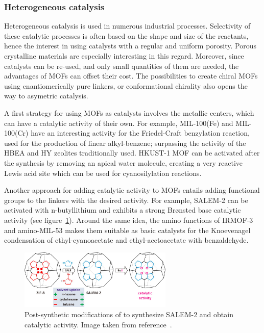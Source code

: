\documentclass[thesis]{subfiles}
\begin{document}
\subsubsection{Heterogeneous catalysis}

Heterogeneous catalysis is used in numerous industrial processes. Selectivity of
these catalytic processes is often based on the shape and size of the reactants,
hence the interest in using catalysts with a regular and uniform porosity.
Porous crystalline materials are especially interesting in this regard.
Moreover, since catalysts can be re-used, and only small quantities of them are
needed, the advantages of MOFs can offset their cost. The possibilities to
create chiral MOFs using enantiomerically pure linkers, or conformational
chirality\cite{Tshabang2018} also opens the way to asymetric catalysis.

A first strategy for using MOFs as catalysts involves the metallic centers,
which can have a catalytic activity of their own. For example, MIL-100(Fe) and
MIL-100(Cr) have an interesting activity for the Friedel-Craft benzylation
reaction, used for the production of linear alkyl-benzene; surpassing the
activity of the HBEA and HY zeolites traditionally used\cite{Horcajada2007}.
HKUST-1 MOF can be activated after the synthesis by removing an apical water
molecule, creating a very reactive Lewis acid site which can be used for
cyanosilylation reactions\cite{Schlichte2004}.

Another approach for adding catalytic activity to MOFs entails adding functional
groups to the linkers with the desired activity. For example, SALEM-2 can be
activated with \mbox{n-butyllithium} and exhibits a strong Brønsted base
catalytic activity\cite{Karagiaridi2012} (see figure~\ref{fig:zif8-to-salem2}).
Around the same idea, the amino functions of IRMOF-3 and amino-MIL-53 makes them
suitable as basic catalysts for the Knoevenagel condensation of
ethyl-cyanoacetate and ethyl-acetoacetate with benzaldehyde\cite{Gascon2009}.

\begin{figure}[ht]
    \centering
    \includegraphics[width=0.65\textwidth]{figures/cited/zif8-to-salem2}
    \caption{Post-synthetic modifications of  to synthesize SALEM-2 and
    obtain catalytic activity. Image taken from reference~\cite{Karagiaridi2012}.}
    \label{fig:zif8-to-salem2}
\end{figure}
\end{document}
